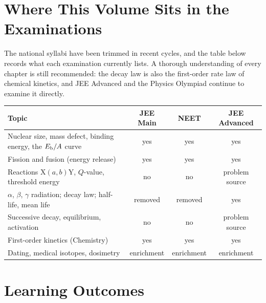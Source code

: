 \section*{Where This Volume Sits in the Examinations}

The national syllabi have been trimmed in recent cycles, and the table below records what each
examination currently lists. A thorough understanding of every chapter is still recommended: the decay
law is also the first-order rate law of chemical kinetics, and JEE Advanced and the Physics Olympiad
continue to examine it directly.

\begin{center}\small
\begin{tabular}{@{}>{\raggedright\arraybackslash}p{}ccc@{}}\toprule
\textbf{Topic} & \textbf{JEE Main} & \textbf{NEET} & \textbf{JEE Advanced}\\\midrule
Nuclear size, mass defect, binding energy, the $E_{\mathrm{b}}/A$ curve & yes & yes & yes\\
Fission and fusion (energy release) & yes & yes & yes\\
Reactions $\mathrm{X}(a,b)\mathrm{Y}$, $Q$-value, threshold energy & no & no & problem source\\
$\alpha$, $\beta$, $\gamma$ radiation; decay law; half-life, mean life & removed & removed & yes\\
Successive decay, equilibrium, activation & no & no & problem source\\
First-order kinetics (Chemistry) & yes & yes & yes\\
Dating, medical isotopes, dosimetry & enrichment & enrichment & enrichment\\\bottomrule
\end{tabular}
\end{center}

\section*{Learning Outcomes}

